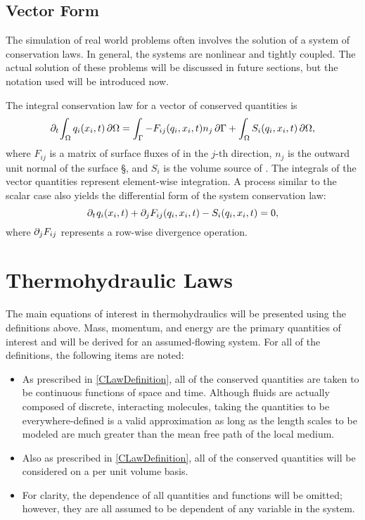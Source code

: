 \documentclass[12pt]{../UWMadThesis}
\begin{document}
\subsection{Vector Form}
The simulation of real world problems often involves the solution of a system of conservation laws.
In general, the systems are nonlinear and tightly coupled.
The actual solution of these problems will be discussed in future sections, but the notation used will be introduced now.

The integral conservation law for a vector of conserved quantities \qi{} is
\begin{equation}%
    \pdt\!\IntV \qi(x_i,t) \dV = \IntS -F_{ij}(\qi,x_i,t) n_j\dS + \IntV S_i(\qi,x_i,t) \dV,
    \label{Eqn:GeneralIntegralCLawForSystems}
\end{equation}
where $F_{ij}$ is a matrix of surface fluxes of \qi{} in the $j$-th direction, $n_j$ is the outward unit normal of the surface \S{}, and $S_i$ is the volume source of \qi{}.
The integrals of the vector quantities represent element-wise integration.
A process similar to the scalar case also yields the differential form of the system conservation law:
\begin{equation}
    \partial_t\:\!q_i(x_i,t) + \partial_j F_{ij}(q_i,x_i,t) - S_i(q_i,x_i,t)  = 0,
    \label{Eqn:PreLimitGeneralIntegralCLawForSystems}
\end{equation}
where $\partial_j F_{ij}$ represents a row-wise divergence operation.






\section{Thermohydraulic Laws}

The main equations of interest in thermohydraulics will be presented using the definitions above.
Mass, momentum, and energy are the primary quantities of interest and will be derived for an assumed-flowing system.
For all of the definitions, the following items are noted:
\begin{itemize}
    \item{
        As prescribed in \cref{CLawDefinition}, all of the conserved quantities are taken to be continuous functions of space and time.
        Although fluids are actually composed of discrete, interacting molecules, taking the quantities to be everywhere-defined is a valid approximation as long as the length scales to be modeled are much greater than the mean free path of the local medium.
        \NeedReference{}
    }
    \item{
        Also as prescribed in \cref{CLawDefinition}, all of the conserved quantities will be considered on a per unit volume basis.
    }
    \item{
        For clarity, the dependence of all quantities and functions will be omitted; however, they are all assumed to be dependent of any variable in the system.
    }
\end{itemize}
\end{document}

